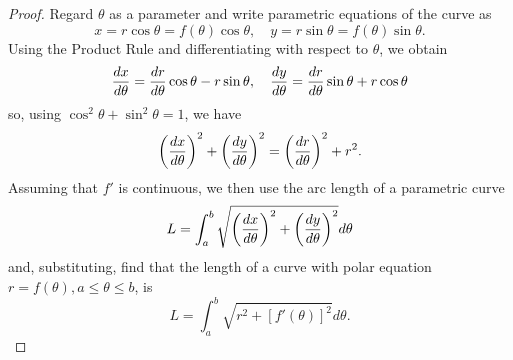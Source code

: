 \documentclass[a4paper,8pt]{article}
\begin{document}
\begin{outline}
    \begin{proof}
      Regard \(\theta\) as a parameter and write parametric equations of the curve as
      \[ x = r\cos{\theta} = f(\theta)\cos{\theta},\quad y = r\sin{\theta} = f(\theta)\sin{\theta}\text{.} \]
      Using the Product Rule and differentiating with respect to \(\theta\), we obtain
      \[ \leibniz[x]{\theta} = \leibniz[r]{\theta}\cos{\theta} - r\sin{\theta},\quad \leibniz[y]{\theta} = \leibniz[r]{\theta}\sin{\theta} + r\cos{\theta} \]
      so, using \(\cos^2\theta + \sin^2\theta = 1\), we have
      \[ \left(\leibniz[x]{\theta}\right)^2 + \left(\leibniz[y]{\theta}\right)^2 = \left(\leibniz[r]{\theta}\right)^2 + r^2\text{.} \]
      Assuming that \(f'\) is continuous, we then use the arc length of a parametric curve
      \[ L = \int_a^b \sqrt{\left(\leibniz[x]{\theta}\right)^2 + \left(\leibniz[y]{\theta}\right)^2}d\theta  \]
      and, substituting, find that the length of a curve with polar equation \(r = f(\theta), a \leq \theta \leq b\), is
      \[ L = \int_a^b \sqrt{r^2 + [f'(\theta)]^2}d\theta\text{.} \]
    \end{proof}

\end{outline}
\end{document}
